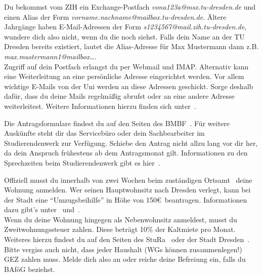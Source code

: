 \begin{itemize}[leftmargin=*]
Du bekommst vom ZIH ein Exchange-Postfach \textit{vona123a@msx.tu-dresden.de}
und einen Alias der Form \textit{vorname.nachname@mailbox.tu-dresden.de}.
Ältere Jahrgänge haben E-Mail-Adressen der Form
\textit{s1234567\allowbreak{}@mail.zih.tu-dresden.de}, wundere dich also nicht,
wenn du die noch siehst. Falls dein Name an der TU Dresden bereits existiert,
lautet die Alias-Adresse für Max Mustermann dann z.B.
\textit{max.mustermann1@mailbox…}. \\
Zugriff auf dein Postfach erlangst du per Webmail und IMAP\@. Alternativ kann eine
Weiterleitung an eine persönliche Adresse eingerichtet werden. Vor allem
wichtige E-Mails von der Uni werden an diese Adressen geschickt. Sorge deshalb
dafür, dass du deine Mails regelmäßig abrufst oder an eine andere Adresse
weiterleitest. Weitere Informationen hierzu finden sich unter~.

Die Antragsformulare findest du auf den Seiten des BMBF~. Für weitere
Auskünfte steht dir das Servicebüro oder dein Sachbearbeiter im
Studierendenwerk zur Verfügung. Schiebe den Antrag nicht allzu lang vor dir
her, da dein Anspruch frühestens ab dem Antragsmonat gilt. Informationen zu den
Sprechzeiten beim Studierendenwerk gibt es hier~.

\pagebreak

Offiziell musst du innerhalb von zwei Wochen beim zuständigen Ortsamt~
deine Wohnung anmelden. Wer seinen Hauptwohnsitz nach Dresden verlegt, kann bei
der Stadt eine \enquote{Umzugsbeihilfe} in Höhe von 150\euro\ beantragen.
Informationen dazu gibt's unter~ und~. \\
Wenn du deine Wohnung hingegen als Nebenwohnsitz anmeldest, musst du
Zweitwohnungssteuer zahlen. Diese beträgt 10\% der Kaltmiete pro Monat.
Weiteres hierzu findest du auf den Seiten des StuRa~ oder der Stadt
Dresden~.
Bitte vergiss auch nicht, dass jeder Haushalt (WGs können zusammenlegen!) GEZ
zahlen muss. Melde dich also an oder reiche deine Befreiung ein, falls du BAföG
beziehst.


\end{itemize}
